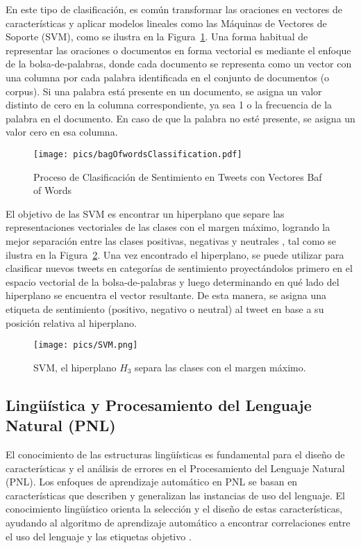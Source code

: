 En este tipo de clasificación, es común transformar las oraciones en vectores de características y aplicar modelos lineales como las Máquinas de Vectores de Soporte (SVM), como se ilustra en la Figura~\ref{fig:senti_class}. Una forma habitual de representar las oraciones o documentos en forma vectorial es mediante el enfoque de la bolsa-de-palabras, donde cada documento se representa como un vector con una columna por cada palabra identificada en el conjunto de documentos (o corpus). Si una palabra está presente en un documento, se asigna un valor distinto de cero en la columna correspondiente, ya sea 1 o la frecuencia de la palabra en el documento. En caso de que la palabra no esté presente, se asigna un valor cero en esa columna.

\begin{figure}[h]
\centering
\texttt{[image: pics/bagOfwordsClassification.pdf]}
\caption{Proceso de Clasificación de Sentimiento en Tweets con Vectores Baf of Words}
\label{fig:senti_class}
\end{figure}

El objetivo de las SVM es encontrar un hiperplano que separe las representaciones vectoriales de las clases con el margen máximo, logrando la mejor separación entre las clases positivas, negativas y neutrales \cite{jacobbook}, tal como se ilustra en la Figura~\ref{fig:svm}. Una vez encontrado el hiperplano, se puede utilizar para clasificar nuevos tweets en categorías de sentimiento proyectándolos primero en el espacio vectorial de la bolsa-de-palabras y luego determinando en qué lado del hiperplano se encuentra el vector resultante. De esta manera, se asigna una etiqueta de sentimiento (positivo, negativo o neutral) al tweet en base a su posición relativa al hiperplano.

\begin{figure}[h]
\centering
\texttt{[image: pics/SVM.png]}
\caption{SVM, el hiperplano $H_3$ separa las clases con el margen máximo.}
\label{fig:svm}
\end{figure}





\subsection{Lingüística y Procesamiento del Lenguaje Natural (PNL)}

El conocimiento de las estructuras lingüísticas es fundamental para el diseño de características y el análisis de errores en el Procesamiento del Lenguaje Natural (PNL). Los enfoques de aprendizaje automático en PNL se basan en características que describen y generalizan las instancias de uso del lenguaje. El conocimiento lingüístico orienta la selección y el diseño de estas características, ayudando al algoritmo de aprendizaje automático a encontrar correlaciones entre el uso del lenguaje y las etiquetas objetivo \cite{bender2013linguistic}.

